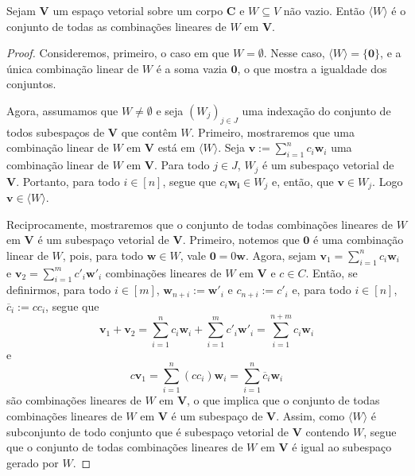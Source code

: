 \begin{theorem}
	Sejam $\bm V$ um espaço vetorial sobre um corpo $\bm C$ e $W \subseteq V$ não vazio. Então $\langle W \rangle$ é o conjunto de todas as combinações lineares de $W$ em $\bm V$.
\end{theorem}
\begin{proof}
	Consideremos, primeiro, o caso em que $W=\emptyset$. Nesse caso, $\langle W \rangle = \{\bm 0\}$, e a única combinação linear de $W$ é a soma vazia $\bm 0$, o que mostra a igualdade dos conjuntos.

	Agora, assumamos que $W \neq \emptyset$ e seja $(W_j)_{j \in J}$ uma indexação do conjunto de todos subespaços de $\bm V$ que contêm $W$. Primeiro, mostraremos que uma combinação linear de $W$ em $\bm V$ está em $\langle W \rangle$. Seja $\bm v := \sum_{i=1}^n c_i\bm w_i$ uma combinação linear de $W$ em $\bm V$. Para todo $j \in J$, $W_j$ é um subespaço vetorial de $\bm V$. Portanto, para todo $i \in [n]$, segue que $c_i \bm{w_i} \in W_j$ e, então, que $\bm v \in W_j$. Logo $\bm v \in \langle W \rangle$.

	Reciprocamente, mostraremos que o conjunto de todas combinações lineares de $W$ em $\bm V$ é um subespaço vetorial de $\bm V$. Primeiro, notemos que $\bm 0$ é uma combinação linear de $W$, pois, para todo $\bm w \in W$, vale $\bm 0 = 0\bm w$. Agora, sejam $\bm v_1 = \sum_{i=1}^n c_i\bm w_i$ e $\bm v_2 = \sum_{i=1}^m c'_i\bm w'_i$ combinações lineares de $W$ em $\bm V$ e $c \in C$. Então, se definirmos, para todo $i \in [m]$, $\bm w_{n+i} := \bm w'_i$ e $c_{n+i} := c'_i$ e, para todo $i \in [n]$, $\overline c_i := cc_i$, segue que
	\begin{equation*}
	\bm v_1 + \bm v_2 = \sum_{i=1}^n c_i\bm w_i + \sum_{i=1}^m c'_i\bm w'_i = \sum_{i=1}^{n+m} c_i\bm w_i
	\end{equation*}
e
	\begin{equation*}
	c\bm v_1 = \sum_{i=1}^n (cc_i)\bm w_i = \sum_{i=1}^n \overline c_i \bm w_i
	\end{equation*}
são combinações lineares de $W$ em $\bm V$, o que implica que o conjunto de todas combinações lineares de $W$ em $\bm V$ é um subespaço de $\bm V$. Assim, como $\langle W \rangle$ é subconjunto de todo conjunto que é subespaço vetorial de $\bm V$ contendo $W$, segue que o conjunto de todas combinações lineares de $W$ em $\bm V$ é igual ao subespaço gerado por $W$.
\end{proof}

